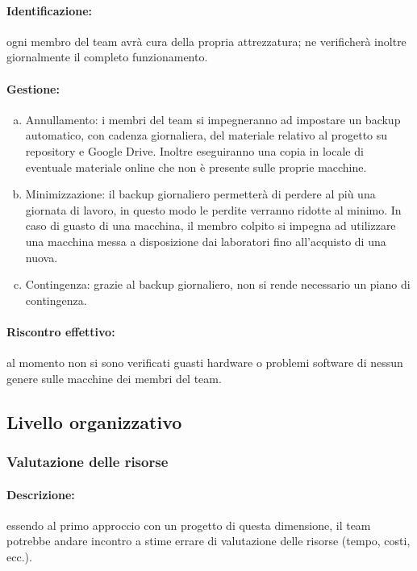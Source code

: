\documentclass[../PianoProgetto.tex]{subfiles}
\begin{document}
	\paragraph*{Identificazione:} ogni membro del team avrà cura della propria attrezzatura; ne verificherà inoltre giornalmente il completo funzionamento.
	
	\paragraph*{Gestione:}
	\begin{enumerate}[(a)]
		\item Annullamento: i membri del team si impegneranno ad impostare un backup automatico, con cadenza giornaliera, del materiale relativo al progetto su 	repository e Google Drive. Inoltre eseguiranno una copia in locale di eventuale materiale online che non è presente sulle proprie macchine.
		\item Minimizzazione: il backup giornaliero permetterà di perdere al più una giornata di lavoro, in questo modo le perdite verranno ridotte al minimo. In caso di guasto di una macchina, il membro colpito si impegna ad utilizzare una macchina messa a disposizione dai laboratori fino all’acquisto di una nuova. 
		\item Contingenza: grazie al backup giornaliero, non si rende necessario un piano di contingenza.
	\end{enumerate} 	
	
	\paragraph*{Riscontro effettivo:} al momento non si sono verificati guasti hardware o problemi software di nessun genere sulle macchine dei membri del team.

\subsection{Livello organizzativo}

\subsubsection{Valutazione delle risorse}

	\paragraph*{Descrizione:} essendo al primo approccio con un progetto di questa dimensione, il team potrebbe andare incontro a stime errare di valutazione delle risorse (tempo, costi, ecc.).
	
\end{document}
